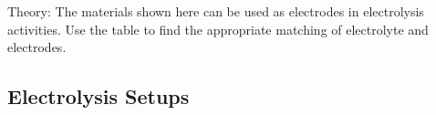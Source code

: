 \begin{multicols}{2}
\begin{description*}
\item[Theory:]{The materials shown here can be used as electrodes in electrolysis activities. Use the table to find the appropriate matching of electrolyte and electrodes.}
\end{description*}

%
%

\subsection{Electrolysis Setups}


\end{multicols}

